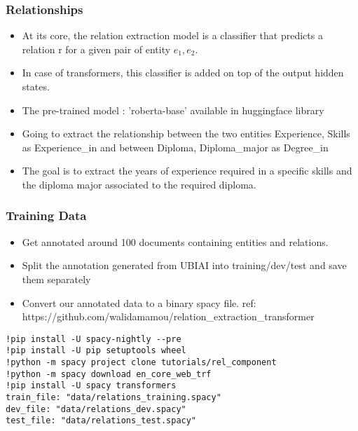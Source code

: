 \begin{frame}[fragile]\frametitle{Relationships}

\begin{itemize}
\item At its core, the relation extraction model is a classifier that predicts a relation r for a given pair of entity ${e_1, e_2}$.
\item In case of transformers, this classifier is added on top of the output hidden states. 
\item The pre-trained model :  'roberta-base'  available in huggingface library
\item Going to extract the relationship between the two entities {Experience, Skills} as Experience\_in and between {Diploma, Diploma\_major} as Degree\_in
\item The goal is to extract the years of experience required in a specific skills and the diploma major associated to the required diploma.
\end{itemize}
	  
\end{frame}

\begin{frame}[fragile]\frametitle{Training Data}

\begin{itemize}
\item Get annotated around 100 documents containing entities and relations.
\item Split the annotation generated from UBIAI into training/dev/test and save them separately
\item Convert our annotated data to a binary spacy file. ref: https://github.com/walidamamou/relation\_extraction\_transformer
\end{itemize}
	  
\begin{lstlisting}
!pip install -U spacy-nightly --pre
!pip install -U pip setuptools wheel
!python -m spacy project clone tutorials/rel_component
!python -m spacy download en_core_web_trf
!pip install -U spacy transformers
train_file: "data/relations_training.spacy"
dev_file: "data/relations_dev.spacy"
test_file: "data/relations_test.spacy"

\end{lstlisting}

\end{frame}

